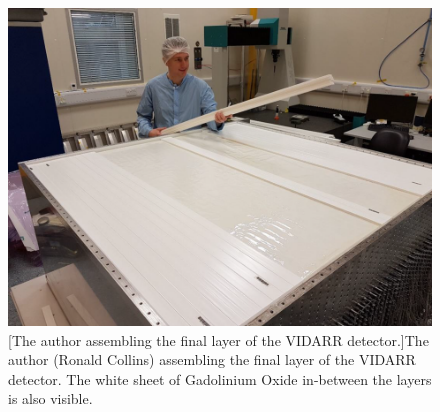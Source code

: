 \begin{figure}[!h]
\centering
\includegraphics[width=0.7\linewidth]{Chapter3/Figs/Raster/detCon006_RonInCleanRoom.png}
[The author assembling the final layer of the VIDARR detector.]{The author (Ronald Collins) assembling the final layer of the VIDARR detector. The white sheet of Gadolinium Oxide in-between the layers is also visible.} 
\label{fig:detCon006_RonInCleanRoom}
\end{figure}

